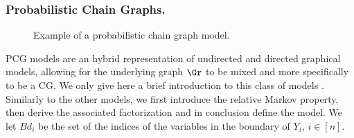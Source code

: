 \begin{comment}
Assume again a sample $\bm{x}=(x_{\bm{j}})_{\bm{j}\in\bm{\mathcal{Y}}}$ has been collected. For a $C\in\mathcal{C}$, the posterior over $\bm{\theta}\;|\;\bm{x}$ is strong hyper Markov and  follows a Dirichlet distribution with parameter $\bm{a}^C+\bm{x}^C$, where $\bm{x}^C$ are the marginal counts over $\bm{Y}_C$, that is $\bm{x}^{C}=(\bm{x}_{\bm{j}}^C)_{\bm{j}\in\bm{\mathcal{Y}}_C}$ and $\bm{x}_{\bm{j}}^C=\sum_{\bm{i}:\bm{i}_C=\bm{j}_C}\bm{x}_{\bm{i}}$. To illustrate this, let $\bm{x}=(x_{ijkl})_{i\in\mathcal{Y}_1,j\in\mathcal{Y}_2,k\in\mathcal{Y}_3,l\in\mathcal{Y}_4}$, $x_{+jkl}=\sum_{i\in\mathcal{Y}_1}x_{ijkl}$ and $x_{ijk+}=\sum_{l\in\mathcal{Y}_4}x_{ijkl}$ in our example. Then in our example the posterior has parameter vector $\bm{a}'=(a_{ijkl}')_{i\in\mathcal{Y}_1,j\in\mathcal{Y}_2,k\in\mathcal{Y}_3,l\in\mathcal{Y}_4}^\T$, where
\begin{equation}
a_{ijkl}'=\frac{(a_{ijk+}+x_{ijk+})(a_{+jkl}+x_{+jkl})}{a_{+jk}+\sum_{i\in\mathcal{Y}_1}x_{ijk+}}=\frac{(a_{ijk+}+x_{ijk+})(a_{+jkl}+x_{+jkl})}{a_{jk+}+\sum_{l\in\mathcal{Y}_4}x_{ijk+}}.
\end{equation}
\end{comment}

\label{sec:UG}
\subsubsection{Probabilistic Chain Graphs.}
\label{sec:PCG}
\begin{figure}
\begin{center}
\end{center}
\caption{Example of a probabilistic chain graph model. \label{fig:CG}}
\end{figure}

\gls{PCG} models are an hybrid representation of undirected and directed graphical models, allowing for the underlying graph $\Gr$ to be mixed and more specifically to be a \gls{CG}. We only give here a brief introduction to this class of models \citep[see e.g][for more details]{Cowell1999a, Frydenberg1990, Drton2009, Lauritzen1996a}. Similarly to the other models, we first introduce the relative Markov property, then derive the associated factorization and in conclusion define the model. We let $Bd_i$ be the set of the indices of the variables in the boundary of $Y_i$, $i\in[n]$.

